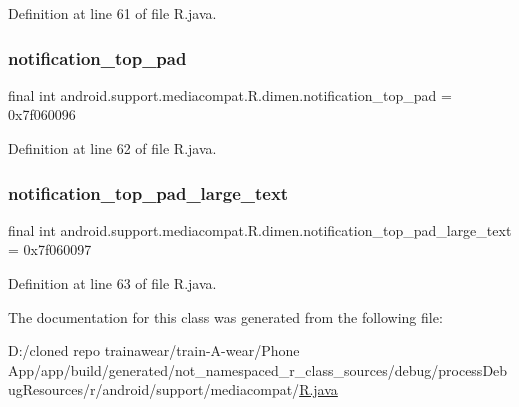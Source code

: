 Definition at line 61 of file R.\+java.

\mbox{\label{classandroid_1_1support_1_1mediacompat_1_1_r_1_1dimen_a8d53f4907024b74a93cc91933e4a17cf}} 
\subsubsection{\texorpdfstring{notification\_top\_pad}{notification\_top\_pad}}
{\footnotesize\ttfamily final int android.\+support.\+mediacompat.\+R.\+dimen.\+notification\+\_\+top\+\_\+pad = 0x7f060096\hspace{0.3cm}{\ttfamily [static]}}



Definition at line 62 of file R.\+java.

\mbox{\label{classandroid_1_1support_1_1mediacompat_1_1_r_1_1dimen_ac39512633a675b7520b8378ea26cd24b}} 
\subsubsection{\texorpdfstring{notification\_top\_pad\_large\_text}{notification\_top\_pad\_large\_text}}
{\footnotesize\ttfamily final int android.\+support.\+mediacompat.\+R.\+dimen.\+notification\+\_\+top\+\_\+pad\+\_\+large\+\_\+text = 0x7f060097\hspace{0.3cm}{\ttfamily [static]}}



Definition at line 63 of file R.\+java.



The documentation for this class was generated from the following file\+:\begin{DoxyCompactItemize}
\item 
D\+:/cloned repo trainawear/train-\/\+A-\/wear/\+Phone App/app/build/generated/not\+\_\+namespaced\+\_\+r\+\_\+class\+\_\+sources/debug/process\+Debug\+Resources/r/android/support/mediacompat/\mbox{\hyperlink{process_debug_resources_2r_2android_2support_2mediacompat_2_r_8java}{R.\+java}}\end{DoxyCompactItemize}

